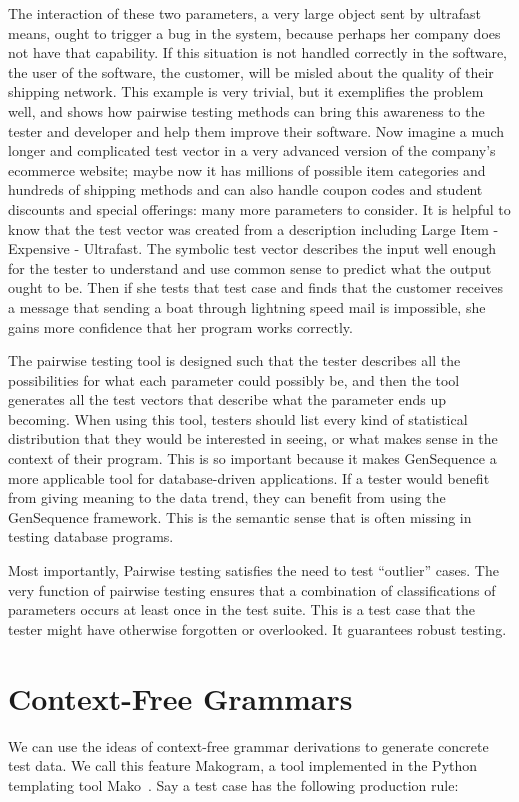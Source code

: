 The interaction of these two parameters, a very large object sent by ultrafast means, ought to trigger a bug in the system, because perhaps her company does not have that capability. If this situation is not handled correctly in the software, the user of the software, the customer, will be misled about the quality of their shipping network. This example is very trivial, but it exemplifies the problem well, and shows how pairwise testing methods can bring this awareness to the tester and developer and help them improve their software. Now imagine a much longer and complicated test vector in a very advanced version of the company’s ecommerce website; maybe now it has millions of possible item categories and hundreds of shipping methods and can also handle coupon codes and student discounts and special offerings: many more parameters to consider. It is helpful to know that the test vector was created from a description including Large Item - Expensive - Ultrafast. The symbolic test vector describes the input well enough for the tester to understand and use common sense to predict what the output ought to be. Then if she tests that test case and finds that the customer receives a message that sending a boat through lightning speed mail is impossible, she gains more confidence that her program works correctly.

The pairwise testing tool is designed such that the tester describes all the possibilities for what each parameter could possibly be, and then the tool generates all the test vectors that describe what the parameter ends up becoming. When using this tool, testers should list every kind of statistical distribution that they would be interested in seeing, or what makes sense in the context of their program. This is so important because it makes GenSequence a more applicable tool for database-driven applications. If a tester would benefit from giving meaning to the data trend, they can benefit from using the GenSequence framework. This is the semantic sense that is often missing in testing database programs.

Most importantly, Pairwise testing satisfies the need to test ``outlier'' cases. The very function of pairwise testing ensures that a combination of classifications of parameters occurs at least once in the test suite. This is a test case that the tester might have otherwise forgotten or overlooked. It guarantees robust testing.

\section{Context-Free Grammars}
We can use the ideas of context-free grammar derivations to generate concrete test data. We call this feature Makogram, a tool implemented in the Python templating tool Mako~\cite{Mako:Template}. Say a test case has the following production rule:

